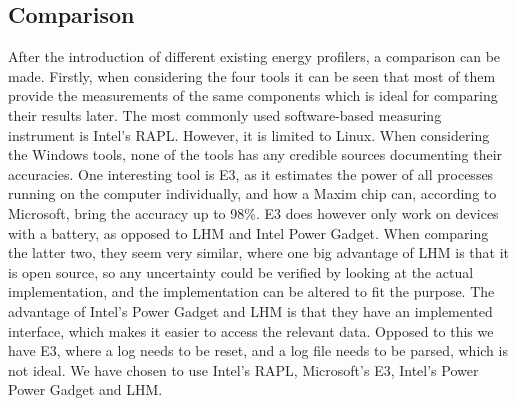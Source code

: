 \subsection{Comparison}\label{subsec:software_comparison}

After the introduction of different existing energy profilers, a comparison can be made. Firstly, when considering the four tools it can be seen that most of them provide the measurements of the same components which is ideal for comparing their results later. The most commonly used software-based measuring instrument is Intel's RAPL. However, it is limited to Linux. When considering the Windows tools, none of the tools has any credible sources documenting their accuracies. One interesting tool is E3, as it estimates the power of all processes running on the computer individually, and how a Maxim chip can, according to Microsoft, bring the accuracy up to 98\%.\cite[]{E3WinHec} E3 does however only work on devices with a battery, as opposed to LHM and Intel Power Gadget. When comparing the latter two, they seem very similar, where one big advantage of LHM is that it is open source, so any uncertainty could be verified by looking at the actual implementation, and the implementation can be altered to fit the purpose. The advantage of Intel's Power Gadget and LHM is that they have an implemented interface, which makes it easier to access the relevant data. Opposed to this we have E3, where a log needs to be reset, and a log file needs to be parsed, which is not ideal. We have chosen to use Intel's RAPL, Microsoft's E3, Intel's Power Power Gadget and LHM. 


